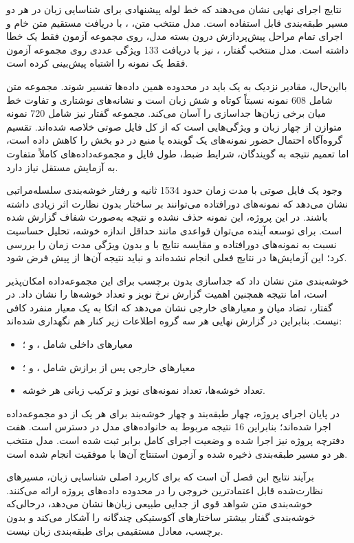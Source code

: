 نتایج اجرای نهایی نشان می‌دهند که خط لوله پیشنهادی برای شناسایی زبان در هر دو مسیر طبقه‌بندی قابل استفاده است. مدل منتخب متن،
،
با دریافت مستقیم متن خام و اجرای تمام مراحل پیش‌پردازش درون بسته مدل، روی مجموعه آزمون فقط یک خطا داشته است. مدل منتخب گفتار،
،
نیز با دریافت 133 ویژگی عددی روی مجموعه آزمون فقط یک نمونه را اشتباه پیش‌بینی کرده است.

بااین‌حال، مقادیر نزدیک به یک باید در محدوده همین داده‌ها تفسیر شوند. مجموعه متن شامل 608 نمونه نسبتاً کوتاه و شش زبان است و نشانه‌های نوشتاری و تفاوت خط میان برخی زبان‌ها جداسازی را آسان می‌کند. مجموعه گفتار نیز شامل 720 نمونه متوازن از چهار زبان و ویژگی‌هایی است که از کل فایل صوتی خلاصه شده‌اند. تقسیم گروه‌آگاه احتمال حضور نمونه‌های یک گوینده یا منبع در دو بخش را کاهش داده است، اما تعمیم نتیجه به گویندگان، شرایط ضبط، طول فایل و مجموعه‌داده‌های کاملاً متفاوت به آزمایش مستقل نیاز دارد.

وجود یک فایل صوتی با مدت زمان حدود 1534 ثانیه و رفتار خوشه‌بندی سلسله‌مراتبی نشان می‌دهد که نمونه‌های دورافتاده می‌توانند بر ساختار بدون نظارت اثر زیادی داشته باشند. در این پروژه، این نمونه حذف نشده و نتیجه به‌صورت شفاف گزارش شده است. برای توسعه آینده می‌توان قواعدی مانند حداقل اندازه خوشه، تحلیل حساسیت نسبت به نمونه‌های دورافتاده و مقایسه نتایج با و بدون ویژگی مدت زمان را بررسی کرد؛ این آزمایش‌ها در نتایج فعلی انجام نشده‌اند و نباید نتیجه آن‌ها از پیش فرض شود.

خوشه‌بندی متن نشان داد که جداسازی بدون برچسب برای این مجموعه‌داده امکان‌پذیر است، اما نتیجه
همچنین اهمیت گزارش نرخ نویز و تعداد خوشه‌ها را نشان داد. در گفتار، تضاد میان
و معیارهای خارجی نشان می‌دهد که اتکا به یک معیار منفرد کافی نیست. بنابراین در گزارش نهایی هر سه گروه اطلاعات زیر کنار هم نگهداری شده‌اند:

\begin{itemize}
	\item معیارهای داخلی شامل ،  و ؛
	\item معیارهای خارجی پس از برازش شامل ،  و ؛
	\item تعداد خوشه‌ها، تعداد نمونه‌های نویز و ترکیب زبانی هر خوشه.
\end{itemize}

در پایان اجرای پروژه، چهار طبقه‌بند و چهار خوشه‌بند برای هر یک از دو مجموعه‌داده اجرا شده‌اند؛ بنابراین 16 نتیجه مربوط به خانواده‌های مدل در دسترس است. هفت دفترچه پروژه نیز اجرا شده و وضعیت اجرای کامل برابر
ثبت شده است. مدل منتخب هر دو مسیر طبقه‌بندی ذخیره شده و آزمون استنتاج آن‌ها با موفقیت انجام شده است.

برآیند نتایج این فصل آن است که برای کاربرد اصلی شناسایی زبان، مسیرهای نظارت‌شده قابل اعتمادترین خروجی را در محدوده داده‌های پروژه ارائه می‌کنند. خوشه‌بندی متن شواهد قوی از جدایی طبیعی زبان‌ها نشان می‌دهد، درحالی‌که خوشه‌بندی گفتار بیشتر ساختارهای آکوستیکی چندگانه را آشکار می‌کند و بدون برچسب، معادل مستقیمی برای طبقه‌بندی زبان نیست.
